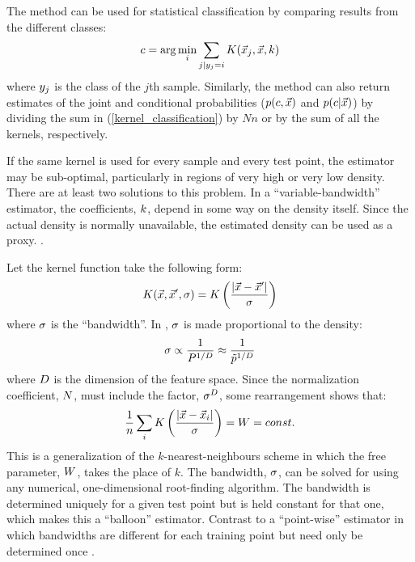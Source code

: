 \documentclass[11pt]{article}
\begin{document}
The method can be used for statistical classification by comparing
results from the different classes:
\begin{equation}
	c = \arg \min_i \sum_{j|y_j = i} K(\vec {x}_j, \vec {x}, k)
	\label{kernel_classification}
\end{equation}
where $y_j$ is the class of the $j$th sample.
Similarly, the method can also return estimates of
the joint and conditional probabilities 
($p(c, \vec x)$ and $p(c |\vec x)$)
by dividing the sum in (\ref{kernel_classification})
by $Nn$ or by the sum of all the kernels, respectively. 

If the same kernel is used for every sample and every test point, the estimator
may be sub-optimal, particularly in regions of very high or very low density.
There are at least two solutions to this problem.
In a ``variable-bandwidth'' estimator, the coefficients, $k$, depend in some
way on the density itself. 
Since the actual density is normally unavailable, the
estimated density can be used as a proxy. 
\citep{Terrell_Scott1992, Mills2011}.

Let the kernel function take the following form:
\begin{equation}
	K(\vec {x}, \vec {x}^\prime, \sigma) = K \left (\frac{|\vec {x} - \vec {x}^\prime|}{\sigma} \right )
	\label{scalar_kernel_def}
\end{equation}
where $\sigma$ is the ``bandwidth''. 
In \citet{Mills2011}, $\sigma$ is made proportional to the density:
\begin{equation}
	\sigma \propto \frac{1}{P^{1/D}} \approx \frac{1}{\tilde p^{1/D}}
	\label{setting_the_bandwidth}
\end{equation}
where $D$ is the dimension of the feature space.
Since the normalization coefficient, $N$, must include the factor,
${\sigma^D}$, some rearrangement shows that:
\begin{equation}
	\frac{1}{n} \sum_i K \left (\frac{|\vec {x} - \vec {x}_i|}{\sigma} \right ) = W = const.
	\label{agf_def}
\end{equation}
This is a generalization of the $k$-nearest-neighbours scheme in which the
free parameter, $W$, takes the place of $k$. \citep{Mills2009, Mills2011}
The bandwidth, $\sigma$, can be solved
for using any numerical, one-dimensional root-finding algorithm.
The bandwidth is determined uniquely for a given test point but is held constant for that
one, which makes this a ``balloon'' estimator. 
Contrast to a ``point-wise'' estimator
in which bandwidths are different for each training point but need only be determined once
\citep{Terrell_Scott1992}.
\end{document}
